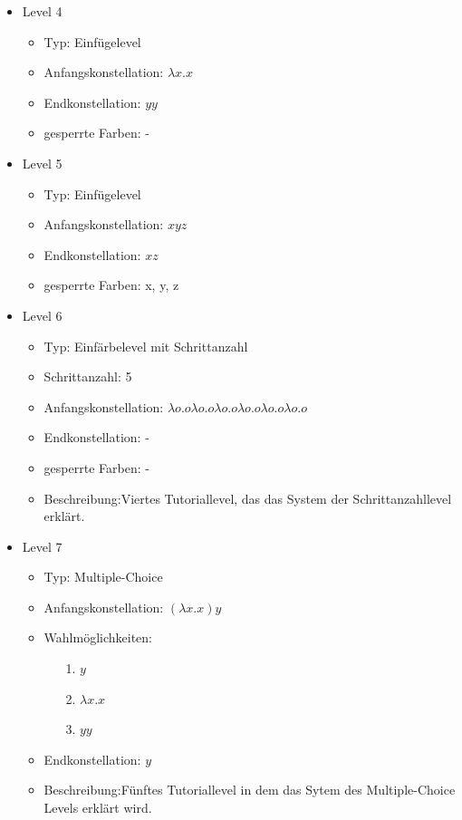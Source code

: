 \begin{itemize}
	\item{Level 4} 
		\begin{itemize}
			\item{Typ:} Einfügelevel
			\item{Anfangskonstellation:} \(\lambda x . x \)    
			\item{Endkonstellation:} \(y y\)
			\item{gesperrte Farben:} - 
		\end{itemize}

	\item{Level 5} 
		\begin{itemize}
			\item{Typ:} Einfügelevel
			\item{Anfangskonstellation:} \(x y z\)    
			\item{Endkonstellation:}  \(x z\)
			\item{gesperrte Farben:} x, y, z
		\end{itemize}

	\item{Level 6} 
		\begin{itemize}
			\item{Typ:} Einfärbelevel mit Schrittanzahl
			\item{Schrittanzahl:} 5
			\item{Anfangskonstellation:} \(\lambda o . o   \lambda o . o  \lambda o . o   \lambda o . o  \lambda o . o   \lambda o . o \) 
			\item{Endkonstellation:}  -
			\item{gesperrte Farben:} -
			\item{Beschreibung:}Viertes Tutoriallevel, das das System der Schrittanzahllevel erklärt.
		\end{itemize}

	\item{Level 7} 
		\begin{itemize}
			\item{Typ:} Multiple-Choice 
			\item{Anfangskonstellation:} \((\lambda x . x ) y\)    
			\item{Wahlmöglichkeiten:}  
				\begin{itemize}
					\item[1.] \(y\)
					\item[2.] \(\lambda x . x \) 
					\item[3.] \(y y\)
				\end{itemize}
			\item{Endkonstellation:} \(y\)
			\item{Beschreibung:}Fünftes Tutoriallevel in dem das Sytem des Multiple-Choice Levels erklärt wird.
		\end{itemize}


\end{itemize}
